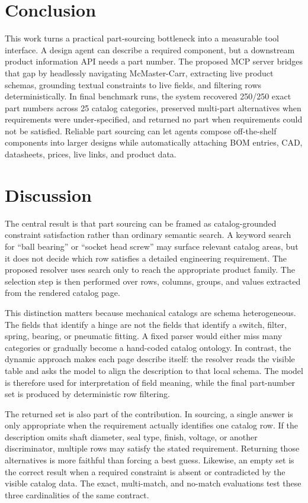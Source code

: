 \documentclass[colorlinks,upint,subscriptcorrection,varvw,hyphenate,balance,nofoot]{asmeconf}
\begin{document}
\section{Conclusion}

This work turns a practical part-sourcing bottleneck into a measurable tool interface. A design agent can describe a required component, but a downstream product information API needs a part number. The proposed MCP server bridges that gap by headlessly navigating McMaster-Carr, extracting live product schemas, grounding textual constraints to live fields, and filtering rows deterministically. In final benchmark runs, the system recovered 250/250 exact part numbers across 25 catalog categories, preserved multi-part alternatives when requirements were under-specified, and returned no part when requirements could not be satisfied. Reliable part sourcing can let agents compose off-the-shelf components into larger designs while automatically attaching BOM entries, CAD, datasheets, prices, live links, and product data.

\section{Discussion}

The central result is that part sourcing can be framed as catalog-grounded constraint satisfaction rather than ordinary semantic search. A keyword search for ``ball bearing'' or ``socket head screw'' may surface relevant catalog areas, but it does not decide which row satisfies a detailed engineering requirement. The proposed resolver uses search only to reach the appropriate product family. The selection step is then performed over rows, columns, groups, and values extracted from the rendered catalog page.

This distinction matters because mechanical catalogs are schema heterogeneous. The fields that identify a hinge are not the fields that identify a switch, filter, spring, bearing, or pneumatic fitting. A fixed parser would either miss many categories or gradually become a hand-coded catalog ontology. In contrast, the dynamic approach makes each page describe itself: the resolver reads the visible table and asks the model to align the description to that local schema. The model is therefore used for interpretation of field meaning, while the final part-number set is produced by deterministic row filtering.

The returned set is also part of the contribution. In sourcing, a single answer is only appropriate when the requirement actually identifies one catalog row. If the description omits shaft diameter, seal type, finish, voltage, or another discriminator, multiple rows may satisfy the stated requirement. Returning those alternatives is more faithful than forcing a best guess. Likewise, an empty set is the correct result when a required constraint is absent or contradicted by the visible catalog data. The exact, multi-match, and no-match evaluations test these three cardinalities of the same contract.
\end{document}
